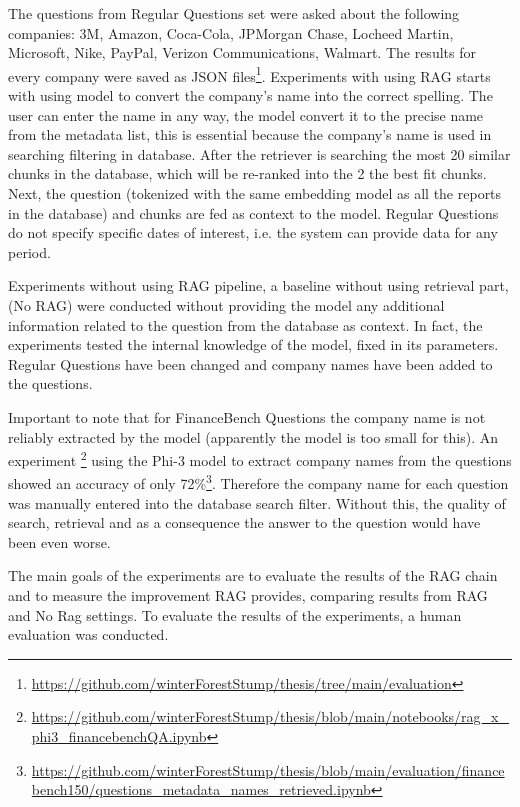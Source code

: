 The questions from Regular Questions set were asked about the following companies: 3M, Amazon, Coca-Cola, JPMorgan Chase, Locheed Martin, Microsoft, Nike, PayPal, Verizon Communications, Walmart. The results for every company were saved as JSON files\footnote{\url{https://github.com/winterForestStump/thesis/tree/main/evaluation}}. Experiments with using RAG starts with using model to convert the company's name into the correct spelling. The user can enter the name in any way, the model convert it to the precise name from the metadata list, this is essential because the company's name is used in searching filtering in database. After the retriever is searching the most 20 similar chunks in the database, which will be re-ranked into the 2 the best fit chunks. Next, the question (tokenized with the same embedding model as all the reports in the database) and chunks are fed as context to the model. Regular Questions do not specify specific dates of interest, i.e. the system can provide data for any period.

Experiments without using RAG pipeline, a baseline without using retrieval part, (No RAG) were conducted without providing the model any additional information related to the question from the database as context. In fact, the experiments tested the internal knowledge of the model, fixed in its parameters. Regular Questions have been changed and company names have been added to the questions.

Important to note that for FinanceBench Questions the company name is not reliably extracted by the model (apparently the model is too small for this). An experiment \footnote{\url{https://github.com/winterForestStump/thesis/blob/main/notebooks/rag_x_phi3_financebenchQA.ipynb}} using the Phi-3 model to extract company names from the questions showed an accuracy of only 72\%\footnote{\url{https://github.com/winterForestStump/thesis/blob/main/evaluation/financebench150/questions_metadata_names_retrieved.ipynb}}. Therefore the company name for each question was manually entered into the database search filter. Without this, the quality of search, retrieval and as a consequence the answer to the question would have been even worse.

The main goals of the experiments are to evaluate the results of the RAG chain and to measure the improvement RAG provides, comparing results from RAG and No Rag settings. To evaluate the results of the experiments, a human evaluation was conducted.

